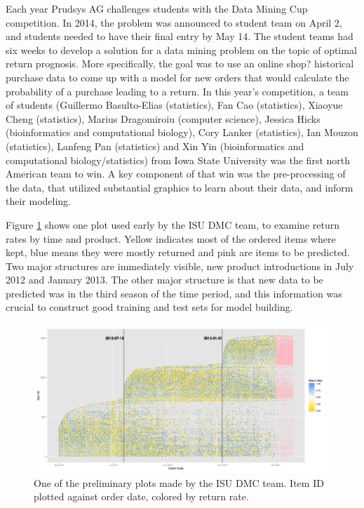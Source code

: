 \documentclass{article}
\begin{document}
Each year Prudsys AG  challenges students with  the Data Mining Cup competition. In 2014, the problem was announced to student team on April 2, and students needed to have their final entry by May 14. The student teams had six weeks to develop a solution for a data mining problem on the topic of optimal return prognosis. More specifically, the goal was to use an online shop? historical purchase data to come up with a model for new orders that would calculate the probability of a purchase leading to a return. In this year's competition, a team of students (Guillermo Basulto-Elias (statistics), Fan Cao (statistics), Xiaoyue Cheng (statistics), Marius Dragomiroiu (computer science), Jessica Hicks (bioinformatics and computational biology), Cory Lanker (statistics), Ian Mouzon (statistics), Lanfeng Pan (statistics) and Xin Yin (bioinformatics and computational biology/statistics) from Iowa State University was the first north American team to win. A key component of that win was the pre-processing of the data, that utilized substantial graphics to learn about their data, and inform their modeling.

Figure \ref{DMC1} shows one plot used early by the ISU DMC team, to examine return rates by time and product. Yellow indicates most of the ordered items where kept, blue means they were mostly returned and pink are items to be predicted. Two major structures are immediately visible, new product introductions in July 2012 and January 2013. The other major structure is that new data to be predicted was in the third season of the time period, and this information was crucial to construct good training and test sets for model building.

\begin{figure}
\centerline{\includegraphics[width=7in]{images/orderDate_itemID.png}}
\caption{One of the preliminary plots made by the ISU DMC team. Item ID plotted against order date, colored by return rate. }
\label{DMC1}
\end{figure}
\end{document}
